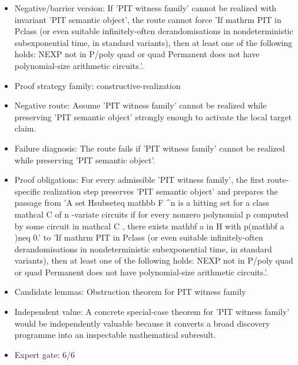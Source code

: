 \documentclass[11pt]{article}
\begin{document}
\begin{itemize}
\item Negative/barrier version: If 'PIT witness family' cannot be realized with invariant 'PIT semantic object', the route cannot force 'If mathrm PIT in Pclass (or even suitable infinitely-often derandomisations in nondeterministic subexponential time, in standard variants), then at least one of the following holds: NEXP not in P/poly quad or quad Permanent does not have polynomial-size arithmetic circuits.'.
\item Proof strategy family: constructive-realization
\item Negative route: Assume 'PIT witness family' cannot be realized while preserving 'PIT semantic object' strongly enough to activate the local target claim.
\item Failure diagnosis: The route fails if 'PIT witness family' cannot be realized while preserving 'PIT semantic object'.
\item Proof obligations: For every admissible 'PIT witness family', the first route-specific realization step preserves 'PIT semantic object' and prepares the passage from 'A set Hsubseteq mathbb F \textasciicircum{}n is a hitting set for a class mathcal C of n -variate circuits if for every nonzero polynomial p computed by some circuit in mathcal C , there exists mathbf a in H with p(mathbf a )neq 0.' to 'If mathrm PIT in Pclass (or even suitable infinitely-often derandomisations in nondeterministic subexponential time, in standard variants), then at least one of the following holds: NEXP not in P/poly quad or quad Permanent does not have polynomial-size arithmetic circuits.'.
\item Candidate lemmas: Obstruction theorem for PIT witness family
\item Independent value: A concrete special-case theorem for 'PIT witness family' would be independently valuable because it converts a broad discovery programme into an inspectable mathematical subresult.
\item Expert gate: 6/6
\end{itemize}
\end{document}
